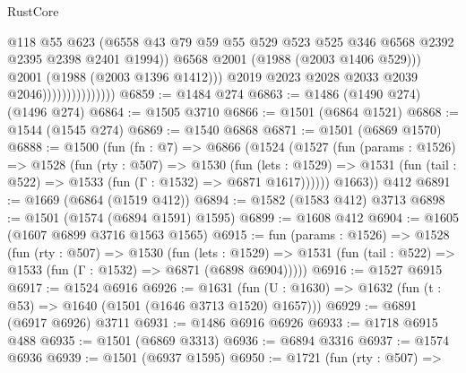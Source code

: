 \begin{lexlean}{RustCore}
\begin{coremodule}
                                        @118
                                        @55
                                        @623
                                        (@6558
                                          @43
                                          @79
                                          @59
                                          @55
                                          @529
                                          @523
                                          @525
                                          @346
                                          @6568
                                          @2392
                                          @2395
                                          @2398
                                          @2401
                                          @1994))
                                      @6568
                                      @2001
                                      (@1988 (@2003 @1406 @529)))
                                    @2001
                                    (@1988 (@2003 @1396 @1412)))
                                  @2019
                                  @2023
                                  @2028
                                  @2033
                                  @2039
                                  @2046)))))))))))))))
@6859 := @1484 @274
@6863 := @1486 (@1490 @274) (@1496 @274)
@6864 := @1505 @3710
@6866 := @1501 (@6864 @1521)
@6868 := @1544 (@1545 @274)
@6869 := @1540 @6868
@6871 := @1501 (@6869 @1570)
@6888 := @1500
    (fun (fn : @7) =>
    @6866
      (@1524
        (@1527
          (fun (params : @1526) =>
          @1528
            (fun (rty : @507) =>
            @1530
              (fun (lets : @1529) =>
              @1531 (fun (tail : @522) => @1533 (fun (Γ : @1532) => @6871 @1617))))))
        @1663))
    @412
@6891 := @1669 (@6864 (@1519 @412))
@6894 := @1582 (@1583 @412) @3713
@6898 := @1501 (@1574 (@6894 @1591) @1595)
@6899 := @1608 @412
@6904 := @1605 (@1607 @6899 @3716 @1563 @1565)
@6915 := fun (params : @1526) =>
  @1528
    (fun (rty : @507) =>
    @1530
      (fun (lets : @1529) =>
      @1531 (fun (tail : @522) => @1533 (fun (Γ : @1532) => @6871 (@6898 @6904)))))
@6916 := @1527 @6915
@6917 := @1524 @6916
@6926 := @1631 (fun (U : @1630) => @1632 (fun (t : @53) => @1640 (@1501 (@1646 @3713 @1520) @1657)))
@6929 := @6891 (@6917 @6926) @3711
@6931 := @1486 @6916 @6926
@6933 := @1718 @6915 @488
@6935 := @1501 (@6869 @3313)
@6936 := @6894 @3316
@6937 := @1574 @6936
@6939 := @1501 (@6937 @1595)
@6950 := @1721
    (fun (rty : @507) =>

\end{coremodule}
\end{lexlean}

